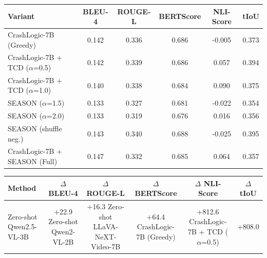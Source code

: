 \begin{tabular}{lccccc}
\toprule
Variant & BLEU-4 & ROUGE-L & BERTScore & NLI-Score & tIoU \\
\midrule
CrashLogic-7B (Greedy) & 0.142 & 0.336 & 0.686 & -0.005 & 0.373 \\
CrashLogic-7B + TCD ($\alpha$=0.5) & 0.142 & 0.339 & 0.686 & 0.057 & 0.394 \\
CrashLogic-7B + TCD ($\alpha$=1.0) & 0.140 & 0.338 & 0.684 & 0.090 & 0.375 \\
SEASON ($\alpha$=1.5) & 0.133 & 0.327 & 0.681 & -0.022 & 0.354 \\
SEASON ($\alpha$=2.0) & 0.133 & 0.319 & 0.676 & 0.016 & 0.356 \\
SEASON (shuffle neg.) & 0.143 & 0.340 & 0.688 & -0.025 & 0.395 \\
CrashLogic-7B + SEASON (Full) & 0.147 & 0.332 & 0.685 & 0.064 & 0.357 \\
\bottomrule
\end{tabular}


\begin{tabular}{lccccc}
\toprule
Method & $\Delta$ BLEU-4 & $\Delta$ ROUGE-L & $\Delta$ BERTScore & $\Delta$ NLI-Score & $\Delta$ tIoU \\
\midrule
Zero-shot Qwen2.5-VL-3B & +22.9%
Zero-shot Qwen2-VL-2B & +16.3%
Zero-shot LLaVA-NeXT-Video-7B & +64.4%
CrashLogic-7B (Greedy) & +812.6%
CrashLogic-7B + TCD ($\alpha$=0.5) & +808.0%
\bottomrule
\end{tabular}

